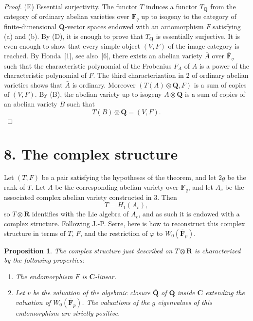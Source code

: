 \documentclass[10pt]{amsart}
\theoremstyle{plain}
\newtheorem{proposition}[theorem]{Proposition}
\theoremstyle{remark}
\begin{document}
\begin{proof}
(E) Essential surjectivity. The functor $T$ induces a functor $T_{\mathbf Q}$ from the category of ordinary abelian varieties over $\mathbf F_q$ up to isogeny to the category of finite-dimensional $\mathbf Q$-vector spaces endowed with an automorphism $F$ satisfying (a) and (b). By (D), it is enough to prove that $T_{\mathbf Q}$ is essentially surjective. It is even enough to show that every simple object $(V,F)$ of the image category is reached. By Honda~[1], see also~[6], there exists an abelian variety $\bar A$ over $\overline{\mathbf F}_q$ such that the characteristic polynomial of the Frobenius $F_A$ of $A$ is a power of the characteristic polynomial of $F$. The third characterization in 2 of ordinary abelian varieties shows that $\bar A$ is ordinary. Moreover $(T(A)\otimes \mathbf Q,F)$ is a sum of copies of $(V,F)$. By (B), the abelian variety up to isogeny $A\otimes \mathbf Q$ is a sum of copies of an abelian variety $B$ such that
\[
T(B)\otimes \mathbf Q=(V,F).
\]
\end{proof}

\section*{8. The complex structure}
Let $(T,F)$ be a pair satisfying the hypotheses of the theorem, and let $2g$ be the rank of $T$. Let $A$ be the corresponding abelian variety over $\mathbf F_q$, and let $A_c$ be the associated complex abelian variety constructed in 3. Then
\[
T=H_1(A_c),
\]
so $T\otimes \mathbf R$ identifies with the Lie algebra of $A_c$, and as such it is endowed with a complex structure. Following J.-P. Serre, here is how to reconstruct this complex structure in terms of $T$, $F$, and the restriction of $\varphi$ to $W_0(\overline{\mathbf F}_p)$.

\begin{proposition}
The complex structure just described on $T\otimes \mathbf R$ is characterized by the following properties:
\begin{enumerate}
\item[(I)] The endomorphism $F$ is $\mathbf C$-linear.
\item[(II)] Let $v$ be the valuation of the algebraic closure $\overline{\mathbf Q}$ of $\mathbf Q$ inside $\mathbf C$ extending the valuation of $W_0(\overline{\mathbf F}_p)$. The valuations of the $g$ eigenvalues of this endomorphism are strictly positive.
\end{enumerate}
\end{proposition}
\end{document}
